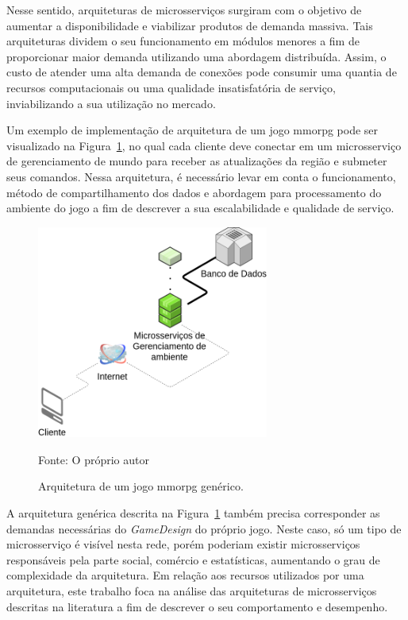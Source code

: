 Nesse sentido, arquiteturas de microsserviços surgiram com o objetivo de aumentar a disponibilidade e viabilizar produtos de demanda massiva.
%
Tais arquiteturas dividem o seu funcionamento em módulos menores a fim de proporcionar maior demanda utilizando uma abordagem distribuída.
%
Assim, o custo de atender uma alta demanda de conexões pode consumir uma quantia de recursos computacionais ou uma qualidade insatisfatória de serviço, inviabilizando a sua utilização no mercado.



Um exemplo de implementação de arquitetura de um jogo \ac{mmorpg} pode ser visualizado na Figura~\ref{fig:generica}, no qual cada cliente deve conectar em um microsserviço de gerenciamento de mundo para receber as atualizações da região e submeter seus comandos.
%
Nessa arquitetura, é necessário levar em conta o funcionamento, método de compartilhamento dos dados e abordagem para processamento do ambiente do jogo a fim de descrever a sua escalabilidade e qualidade de serviço.


\begin{figure}[htb!]
\caption{Arquitetura de um jogo \ac{mmorpg} genérico.}
\label{fig:generica}
\includegraphics[height=7.0cm]{img/cap3/generica.png}
\centering

Fonte: O próprio autor
\end{figure}

A arquitetura genérica descrita na Figura~\ref{fig:generica} também precisa corresponder as demandas necessárias do \textit{GameDesign} do próprio jogo.
%
Neste caso, só um tipo de microsserviço é visível nesta rede, porém poderiam existir microsserviços responsáveis pela parte social, comércio e estatísticas, aumentando o grau de complexidade da arquitetura.
%
Em relação aos recursos utilizados por uma arquitetura, este trabalho foca na análise das arquiteturas de microsserviços descritas na literatura a fim de descrever o seu comportamento e desempenho.



